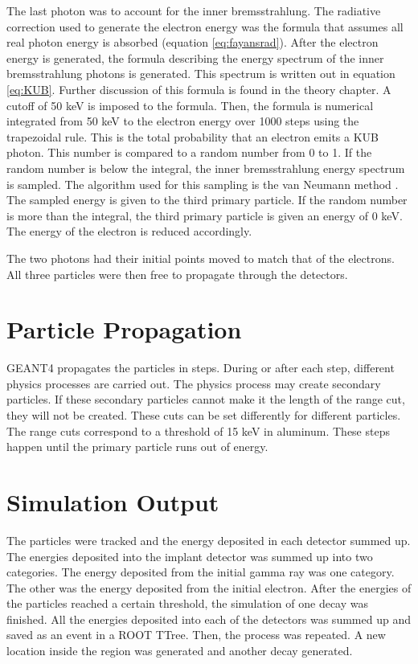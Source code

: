 \documentclass[../MaxHughesThesis.tex]{subfiles}
\begin{document}
The last photon was to account for the inner bremsstrahlung.
The radiative correction used to generate the electron energy was the formula that assumes all real photon energy is absorbed (equation \ref{eq:fayansrad}).
After the electron energy is generated, the formula describing the energy spectrum of the inner bremsstrahlung photons is generated. 
This spectrum is written out in equation \ref{eq:KUB}. %
Further discussion of this formula is found in the theory chapter.
A cutoff of 50 keV is imposed to the formula.
Then, the formula is numerical integrated from 50 keV to the electron energy over 1000 steps using the trapezoidal rule.
This is the total probability that an electron emits a KUB photon.
This number is compared to a random number from 0 to 1.
If the random number is below the integral, the inner bremsstrahlung energy spectrum is sampled.
The algorithm used for this sampling is the van Neumann method \cite{neu51}.
The sampled energy is given to the third primary particle.
If the random number is more than the integral, the third primary particle is given an energy of 0 keV.
The energy of the electron is reduced accordingly.

The two photons had their initial points moved to match that of the electrons.
All three particles were then free to propagate through the detectors.

\section{Particle Propagation}  
GEANT4 propagates the particles in steps.
During or after each step, different physics processes are carried out.
The physics process may create secondary particles.
If these secondary particles cannot make it the length of the range cut, they will not be created.
These cuts can be set differently for different particles.
The range cuts correspond to a threshold of 15 keV in aluminum.
These steps happen until the primary particle runs out of energy.

\section{Simulation Output}
The particles were tracked and the energy deposited in each detector summed up.
The energies deposited into the implant detector was summed up into two categories.
The energy deposited from the initial gamma ray was one category.
The other was the energy deposited from the initial electron.
After the energies of the particles reached a certain threshold, the simulation of one decay was finished.
All the energies deposited into each of the detectors was summed up and saved as an event in a ROOT TTree.
Then, the process was repeated.
A new location inside the region was generated and another decay generated.
\end{document}
